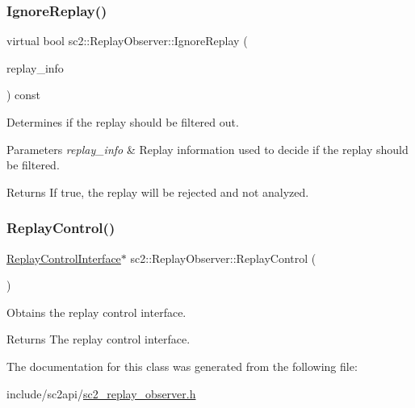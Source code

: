 \subsubsection{\texorpdfstring{Ignore\+Replay()}{IgnoreReplay()}}
{\footnotesize\ttfamily virtual bool sc2\+::\+Replay\+Observer\+::\+Ignore\+Replay (\begin{DoxyParamCaption}\item[{const \hyperlink{structsc2_1_1_replay_info}{Replay\+Info} \&}]{replay\+\_\+info }\end{DoxyParamCaption}) const\hspace{0.3cm}{\ttfamily [virtual]}}

Determines if the replay should be filtered out. 
\begin{DoxyParams}{Parameters}
{\em replay\+\_\+info} & Replay information used to decide if the replay should be filtered. \\
\hline
\end{DoxyParams}
\begin{DoxyReturn}{Returns}
If \textquotesingle{}true\textquotesingle{}, the replay will be rejected and not analyzed. 
\end{DoxyReturn}
\mbox{\label{classsc2_1_1_replay_observer_a99198b2295dc998662b929f96ad17d65}} 
\subsubsection{\texorpdfstring{Replay\+Control()}{ReplayControl()}}
{\footnotesize\ttfamily \hyperlink{classsc2_1_1_replay_control_interface}{Replay\+Control\+Interface}$\ast$ sc2\+::\+Replay\+Observer\+::\+Replay\+Control (\begin{DoxyParamCaption}{ }\end{DoxyParamCaption})}

Obtains the replay control interface. \begin{DoxyReturn}{Returns}
The replay control interface. 
\end{DoxyReturn}


The documentation for this class was generated from the following file\+:\begin{DoxyCompactItemize}
\item 
include/sc2api/\hyperlink{sc2__replay__observer_8h}{sc2\+\_\+replay\+\_\+observer.\+h}\end{DoxyCompactItemize}
